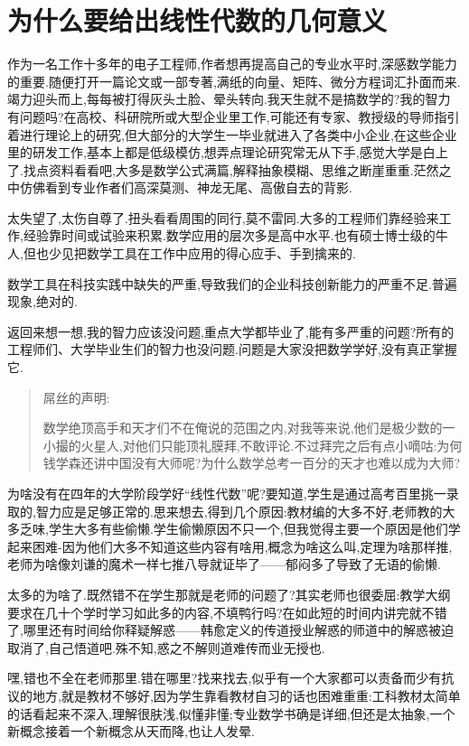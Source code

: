 \documentclass[12pt]{article}
\renewcommand{\,}{\ \text{,}}
\renewcommand{\.}{\ \text{.}}
\begin{document}
\section{为什么要给出线性代数的几何意义}

作为一名工作十多年的电子工程师,作者想再提高自己的专业水平时,深感数学能力的重要.随便打开一篇论文或一部专著,满纸的向量、矩阵、微分方程词汇扑面而来.竭力迎头而上,每每被打得灰头土脸、晕头转向.我天生就不是搞数学的?我的智力有问题吗?在高校、科研院所或大型企业里工作,可能还有专家、教授级的导师指引着进行理论上的研究,但大部分的大学生一毕业就进入了各类中小企业,在这些企业里的研发工作,基本上都是低级模仿,想弄点理论研究常无从下手,感觉大学是白上了.找点资料看看吧,大多是数学公式满篇,解释抽象模糊、思维之断崖重重.茫然之中仿佛看到专业作者们高深莫测、神龙无尾、高傲自去的背影.

太失望了,太伤自尊了.扭头看看周围的同行,莫不雷同.大多的工程师们靠经验来工作,经验靠时间或试验来积累.数学应用的层次多是高中水平.也有硕士博士级的牛人,但也少见把数学工具在工作中应用的得心应手、手到擒来的.

数学工具在科技实践中缺失的严重,导致我们的企业科技创新能力的严重不足.普遍现象,绝对的.

返回来想一想,我的智力应该没问题,重点大学都毕业了,能有多严重的问题?所有的工程师们、大学毕业生们的智力也没问题.问题是大家没把数学学好,没有真正掌握它.

\begin{quote}
屌丝的声明:

数学绝顶高手和天才们不在俺说的范围之内,对我等来说,他们是极少数的一小撮的火星人,对他们只能顶礼膜拜,不敢评论.不过拜完之后有点小嘀咕:为何钱学森还讲中国没有大师呢?为什么数学总考一百分的天才也难以成为大师?
\end{quote}

为啥没有在四年的大学阶段学好``线性代数''呢?要知道,学生是通过高考百里挑一录取的,智力应是足够正常的.思来想去,得到几个原因:教材编的大多不好,老师教的大多乏味,学生大多有些偷懒.学生偷懒原因不只一个,但我觉得主要一个原因是他们学起来困难-因为他们大多不知道这些内容有啥用,概念为啥这么叫,定理为啥那样推,老师为啥像刘谦的魔术一样七推八导就证毕了------郁闷多了导致了无语的偷懒.

太多的为啥了.既然错不在学生那就是老师的问题了?其实老师也很委屈:教学大纲要求在几十个学时学习如此多的内容,不填鸭行吗?在如此短的时间内讲完就不错了,哪里还有时间给你释疑解惑------韩愈定义的传道授业解惑的师道中的解惑被迫取消了,自己悟道吧.殊不知,惑之不解则道难传而业无授也.

嘿,错也不全在老师那里.错在哪里?找来找去,似乎有一个大家都可以责备而少有抗议的地方,就是教材不够好,因为学生靠看教材自习的话也困难重重:工科教材太简单的话看起来不深入,理解很肤浅,似懂非懂;专业数学书确是详细,但还是太抽象,一个新概念接着一个新概念从天而降,也让人发晕.
\end{document}
